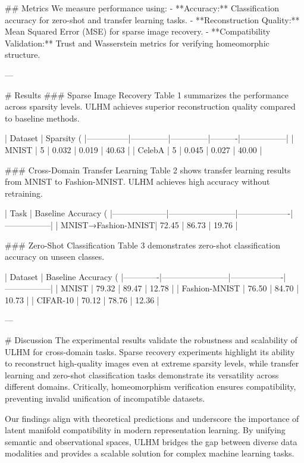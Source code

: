 ## Metrics  
We measure performance using:
- **Accuracy:** Classification accuracy for zero-shot and transfer learning tasks.
- **Reconstruction Quality:** Mean Squared Error (MSE) for sparse image recovery.
- **Compatibility Validation:** Trust and Wasserstein metrics for verifying homeomorphic structure.

---

# Results  
### Sparse Image Recovery  
Table 1 summarizes the performance across sparsity levels. ULHM achieves superior reconstruction quality compared to baseline methods.

| Dataset       | Sparsity (%
|---------------|--------------|--------------|----------|-----------------|
| MNIST         | 5            | 0.032        | 0.019    | 40.63           |
| CelebA        | 5            | 0.045        | 0.027    | 40.00           |

### Cross-Domain Transfer Learning  
Table 2 shows transfer learning results from MNIST to Fashion-MNIST. ULHM achieves high accuracy without retraining.

| Task               | Baseline Accuracy (%
|--------------------|------------------------|-------------------|-----------------|
| MNIST→Fashion-MNIST| 72.45                 | 86.73             | 19.76           |

### Zero-Shot Classification  
Table 3 demonstrates zero-shot classification accuracy on unseen classes.

| Dataset     | Baseline Accuracy (%
|-------------|------------------------|-------------------|-----------------|
| MNIST       | 79.32                 | 89.47             | 12.78           |
| Fashion-MNIST | 76.50                | 84.70             | 10.73           |
| CIFAR-10    | 70.12                 | 78.76             | 12.36           |

---

# Discussion  
The experimental results validate the robustness and scalability of ULHM for cross-domain tasks. Sparse recovery experiments highlight its ability to reconstruct high-quality images even at extreme sparsity levels, while transfer learning and zero-shot classification tasks demonstrate its versatility across different domains. Critically, homeomorphism verification ensures compatibility, preventing invalid unification of incompatible datasets.

Our findings align with theoretical predictions and underscore the importance of latent manifold compatibility in modern representation learning. By unifying semantic and observational spaces, ULHM bridges the gap between diverse data modalities and provides a scalable solution for complex machine learning tasks.

